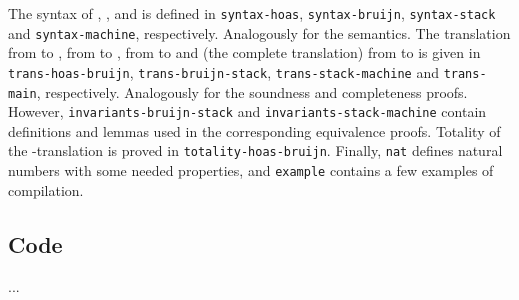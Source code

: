 The syntax of \hlang, \blang, \slang and \mlang is defined in \texttt{syntax-hoas}, \texttt{syntax-bruijn}, \texttt{syntax-stack} and \texttt{syntax-machine}, respectively.
Analogously for the semantics.
The translation from \hlang to \blang, from \blang to \slang, from \slang to \mlang and (the complete translation) from \hlang to \mlang is given in \texttt{trans-hoas-bruijn}, \texttt{trans-bruijn-stack}, \texttt{trans-stack-machine} and \texttt{trans-main}, respectively.
Analogously for the soundness and completeness proofs.
However, \texttt{invariants-bruijn-stack} and \texttt{invariants-stack-machine} contain definitions and lemmas used in the corresponding equivalence proofs.
Totality of the \hlang-\blang translation is proved in \texttt{totality-hoas-bruijn}.
Finally, \texttt{nat} defines natural numbers with some needed properties, and \texttt{example} contains a few examples of compilation.

\subsection{Code}

...

